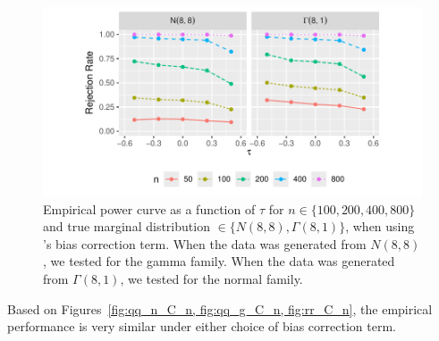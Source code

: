 \documentclass[12pt]{article}
\begin{document}
\begin{figure}[tbp]
  \centering
  \includegraphics[scale=1]{figures/rr_C_n}
  \caption{Empirical power curve as a function of $\tau$ for
    $n \in \{100, 200, 400, 800\}$ and true marginal distribution
    $\in \{N(8,8), \Gamma(8,1)\}$, when using \citet{babu2004goodness}'s bias correction term. When the data was generated from $N(8,8)$,
    we tested for the gamma family. When the data was generated from
    $\Gamma(8,1)$, we tested for the normal family.
  }
  \label{fig:rr_C_n}
\end{figure}

Based on Figures~\ref{fig:qq_n_C_n, fig:qq_g_C_n, fig:rr_C_n}, the empirical performance is very similar under either choice of bias correction term.



\end{document}

